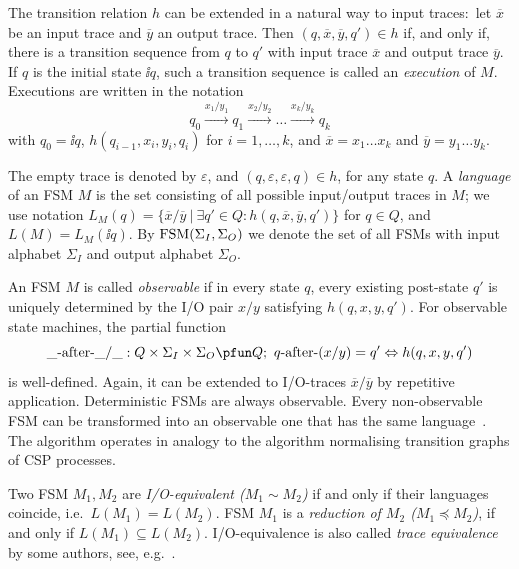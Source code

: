 The transition relation $h$ can be extended in a natural way to input
traces:~let $\overline{x}$ be an input trace and $\overline{y}$ an output
trace. Then $(q,\overline{x},\overline{y},q')\in h$ if, and only if, there is
a transition sequence from $q$ to $q'$ with input trace $\overline{x}$ and
output trace $\overline{y}$. If $q$ is the initial state $\ii{q}$, such a
transition sequence is called an \emph{execution} of $M$. Executions are
written in the notation
$$
q_0 \xrightarrow{x_1/y_1} q_1 \xrightarrow{x_2/y_2} \dots \xrightarrow{x_{k}/y_{k}} q_{k}
$$
with $q_0 = \ii{q}$, $h(q_{i-1},x_i,y_i,q_{i})$ for $i = 1,\dots,k$, and
$\overline{x} = x_1\dots x_k$ and $\overline{y} = y_1\dots y_k$.

The empty trace is denoted by $\varepsilon$, and
$(q,\varepsilon,\varepsilon,q)\in h$, for any state $q$.
A \emph{language}  of an FSM $M$  is the set consisting of all possible input/output
traces in $M$; we use notation
 $L_M(q)=\{\overline{x}/\overline{y}~|~\exists q'\in Q: h(q,\overline{x},\overline{y},q')\}$ for $q\in Q$, and  $L(M)=L_M(\ii{q})$.
By $\text{FSM}(\Sigma_I,\Sigma_O)$ we denote the set of all FSMs with input alphabet $\Sigma_I$ and
output alphabet $\Sigma_O$.

An FSM $M$ is called \emph{observable} if in every state $q$, every existing post-state $q'$ is uniquely determined by the I/O pair $x/y$ satisfying $h(q,x,y,q')$. For
observable state machines, the partial function
$$
\_ \after\_ /\_ : Q\times\Sigma_I\times \Sigma_O \pfun Q;\
q\after(x/y) = q' \Leftrightarrow h(q,x,y,q')
$$
is well-defined. Again, it can be extended to I/O-traces $\overline x/\overline y$
by repetitive application.
Deterministic FSMs are always observable. Every non-observable FSM can be transformed into an observable one that has the same language~\cite{PeleskaHuangLectureNotesMBT}. The algorithm
operates in analogy to the algorithm normalising transition graphs of CSP processes.

Two FSM $M_1, M_2$ are \emph{I/O-equivalent ($M_1\sim M_2$)} if and only if their languages coincide, i.e.~$L(M_1) = L(M_2)$. FSM $M_1$ is a \emph{reduction of $M_2$ ($M_1 \preceq M_2$)},
if and only if $L(M_1) \subseteq L(M_2)$. I/O-equivalence is also called
\emph{trace equivalence} by some authors, see, e.g.~\cite{luo_test_1994}.



